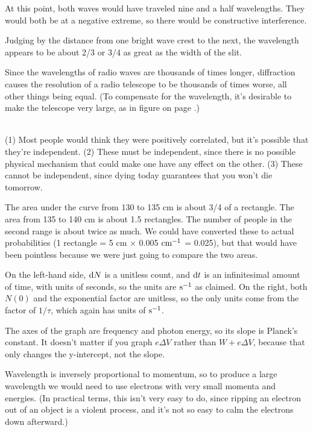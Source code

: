 At this point, both waves would have traveled nine and a half wavelengths. They would both be at a
negative extreme, so there would be constructive interference.

Judging by the distance from one bright wave crest to the next, the wavelength appears to be about
2/3 or 3/4 as great as the width of the slit.

Since the wavelengths of radio waves are thousands of times longer, diffraction causes the resolution
of a radio telescope to be thousands of times worse, all other things being equal. (To compensate
for the wavelength, it's desirable to make the telescope very large, as in figure
 on page \pageref{fig:very-large-array}.)

\noindent{}\\
(1) Most people would think they were positively correlated, but it's possible that 
they're independent.
 (2) These must be independent, since there is no possible physical mechanism that could make one have any effect on the other.
 (3) These cannot be independent, since dying today guarantees that you won't die tomorrow.

The area under the curve from 130 to 135 cm is about 3/4 of a rectangle. The
 area from 135 to 140 cm is about 1.5 rectangles. The number of people in the
 second range is about twice as much. We could have converted these to actual
 probabilities (1 rectangle = 5 cm $\times$ 0.005 $\textup{cm}^{-1}$ = 0.025), but that
 would have been pointless because we were just going to compare the two areas.

On the left-hand side, $\operatorname{d\!} N$ is a unitless count, and $\operatorname{d\!} t$ is an infinitesimal amount of
time, with units of seconds, so the units are $\textup{s}^{-1}$ as claimed. On the right, both
$N(0)$ and the exponential factor are unitless, so the only units come from the factor of $1/\tau$,
which again has units of $\textup{s}^{-1}$.


The axes of the graph are frequency and photon energy, so its slope is Planck's constant.
It doesn't matter if you graph $e\Delta V$  rather than $W+e\Delta V$, because that only
changes the y-intercept, not the slope.

Wavelength is inversely proportional to momentum, so to produce a large wavelength we
 would need to use electrons with very small momenta and energies. (In practical terms,
 this isn't very easy to do, since ripping an electron out of an object is a violent
 process, and it's not so easy to calm the electrons down afterward.)

